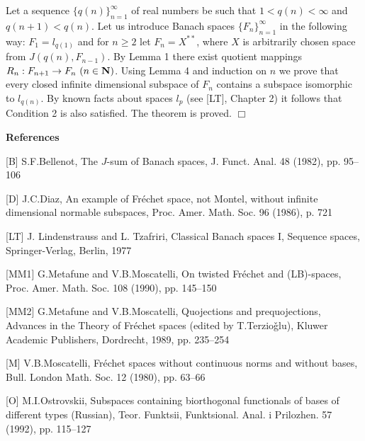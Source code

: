 Let a sequence $\{q(n)\}_{n=1}^\infty$ of real numbers be such that
$1<q(n)<\infty$ and $q(n+1)<q(n)$. Let us introduce Banach spaces
$\{F_n\}_{n=1}^\infty$ in the following way: $F_1=l_{q(1)}$ and
for $n\ge 2$ let $F_n=X^{**}$, where $X$ is arbitrarily chosen
space from $J(q(n), F_{n-1})$. By Lemma 1 there exist quotient
mappings $R_n:F_{n+1}\to F_n\ (n\in{\bf N})$. Using Lemma 4 and
induction on $n$ we prove that every closed infinite dimensional
subspace of $F_n$ contains a subspace isomorphic to $l_{q(n)}$.
By known facts about spaces $l_p$ (see [LT], Chapter 2) it follows
that Condition 2 is also satisfied. The theorem is proved. $\Box$
\newpage
\centerline{\bf References}

[B] S.F.Bellenot,
The $J$-sum of Banach spaces,
J. Funct. Anal.
48
(1982), pp. 95--106

[D] J.C.Diaz, An example of Fr\'echet space, not Montel, without
infinite dimensional normable subspaces, Proc. Amer. Math. Soc.
96 (1986), p. 721

[LT] J. Lindenstrauss and L. Tzafriri,
Classical Banach
spaces I, Sequence spaces, Springer-Verlag, Berlin, 1977

[MM1] G.Metafune and V.B.Moscatelli,
On twisted Fr\'echet and (LB)-spaces,
Proc. Amer. Math. Soc.
108
(1990), pp. 145--150


[MM2] G.Metafune and V.B.Moscatelli,
Quojections and prequojections,
Advances in the Theory of Fr\'echet spaces
(edited by T.Terzio\v glu), Kluwer Academic Publishers, Dordrecht,
1989, pp. 235--254

[M] V.B.Moscatelli, Fr\'echet spaces without continuous norms
and without bases, Bull. London Math. Soc. 12 (1980), pp. 63--66

[O] M.I.Ostrovskii, Subspaces containing biorthogonal functionals of
bases of different types (Russian), Teor. Funktsii,  Funktsional.  Anal. i
   Prilozhen. 57 (1992), pp. 115--127



